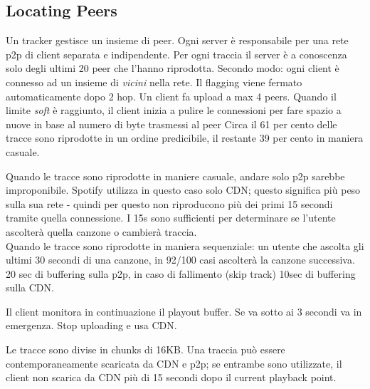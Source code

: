 \subsection{Locating Peers}
Un tracker gestisce un insieme di peer. Ogni server è responsabile per una rete p2p di client separata e indipendente. Per ogni traccia il server è a conoscenza solo degli ultimi 20 peer che l'hanno riprodotta. 
Secondo modo: ogni client è connesso ad un insieme di \textit{vicini} nella rete. Il flagging viene fermato automaticamente dopo 2 hop.
Un client fa upload a max 4 peers.
Quando il limite \textit{soft} è raggiunto, il client inizia a pulire le connessioni per fare spazio a nuove in base al numero di byte trasmessi al peer %
Circa il 61 per cento delle tracce sono riprodotte in un ordine predicibile, il restante 39 per cento in maniera casuale.

Quando le tracce sono riprodotte in maniere casuale, andare solo p2p sarebbe improponibile. Spotify utilizza in questo caso solo CDN; questo significa più peso sulla sua rete - quindi per questo non riproducono più dei primi 15 secondi tramite quella connessione. I 15s sono sufficienti per determinare se l'utente ascolterà quella canzone o cambierà traccia.\\

Quando le tracce sono riprodotte in maniera sequenziale: un utente che ascolta gli ultimi 30 secondi di una canzone, in 92/100 casi ascolterà la canzone successiva. 20 sec di buffering sulla p2p, in caso di fallimento (skip track) 10sec di buffering sulla CDN. 

Il client monitora in continuazione il playout buffer. Se va sotto ai 3 secondi va in emergenza. Stop uploading e usa CDN.

Le tracce sono divise in chunks di 16KB. Una traccia può essere contemporaneamente scaricata da CDN e p2p; se entrambe sono utilizzate, il client non scarica da CDN più di 15 secondi dopo il current playback point.